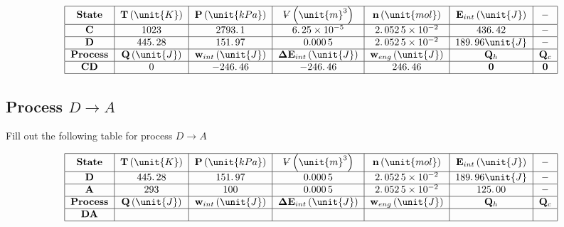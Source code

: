 \documentclass{article}
\begin{document}
\[
\begin{tabular}{|c|c|c|c|c|c|c|}
\hline
\textbf{State} & $\mathbf{T}\left( \unit{K}\right) $ & $\mathbf{P}\left( 
\unit{kPa}\right) $ & $%
\ooalign{\hfil$V$\hfil\cr\kern0.1em--\hfil\cr}%
\left( \unit{m}^{3}\right) $ & $\mathbf{n}\left( \unit{mol}\right) $ & $%
\mathbf{E}_{int}\left( \unit{J}\right) $ & \textbf{--} \\ \hline
$\mathbf{C}$ & $1023$ & $2793.\,\allowbreak 1$ & $6.\,25\times 10^{-5}$ & $%
2.\,052\,5\times 10^{-2}$ & $436.\,\allowbreak 42$ & \textbf{--} \\ \hline
$\mathbf{D}$ & $445.\,\allowbreak 28$ & $151.\,\allowbreak 97$ & $0.000\,5$
& $2.\,052\,5\times 10^{-2}$ & $189.\,\allowbreak 96\unit{J}$ & \textbf{--}
\\ \hline
\textbf{Process} & $\mathbf{Q}\left( \unit{J}\right) $ & $\mathbf{w}%
_{int}\left( \unit{J}\right) $ & $\mathbf{\Delta E}_{int}\left( \unit{J}%
\right) $ & $\mathbf{w}_{eng}\left( \unit{J}\right) $ & $\mathbf{Q}_{h}$ & $%
\mathbf{Q}_{c}$ \\ \hline
$\mathbf{CD}$ & $0$ & $-246.\,\allowbreak 46$ & $-246.\,\allowbreak 46$ & $%
246.\,\allowbreak 46$ & $\mathbf{0}$ & $\mathbf{0}$ \\ \hline
\end{tabular}%
\]%
\pagebreak

\subsection{\textbf{Process }$D\rightarrow A$}

Fill out the following table for process $D\rightarrow A$

\[
\begin{tabular}{|c|c|c|c|c|c|c|}
\hline
\textbf{State} & $\mathbf{T}\left( \unit{K}\right) $ & $\mathbf{P}\left( 
\unit{kPa}\right) $ & $%
\ooalign{\hfil$V$\hfil\cr\kern0.1em--\hfil\cr}%
\left( \unit{m}^{3}\right) $ & $\mathbf{n}\left( \unit{mol}\right) $ & $%
\mathbf{E}_{int}\left( \unit{J}\right) $ & \textbf{--} \\ \hline
$\mathbf{D}$ & $445.\,\allowbreak 28$ & $151.\,\allowbreak 97$ & $0.000\,5$
& $2.\,052\,5\times 10^{-2}$ & $189.\,\allowbreak 96\unit{J}$ & \textbf{--}
\\ \hline
$\mathbf{A}$ & $293$ & $100$ & $0.000\,5$ & $2.\,052\,5\times 10^{-2}$ & $%
\allowbreak 125.\,\allowbreak 00$ & \textbf{--} \\ \hline
\textbf{Process} & $\mathbf{Q}\left( \unit{J}\right) $ & $\mathbf{w}%
_{int}\left( \unit{J}\right) $ & $\mathbf{\Delta E}_{int}\left( \unit{J}%
\right) $ & $\mathbf{w}_{eng}\left( \unit{J}\right) $ & $\mathbf{Q}_{h}$ & $%
\mathbf{Q}_{c}$ \\ \hline
$\mathbf{DA}$ &  &  &  &  &  &  \\ \hline
\end{tabular}%
\]
\end{document}
